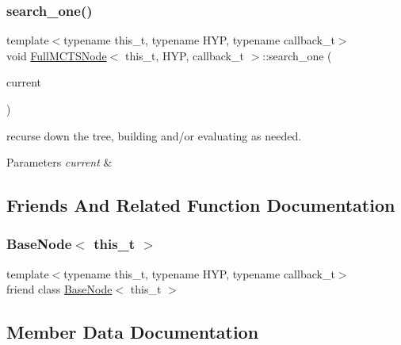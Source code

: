 \subsubsection{\texorpdfstring{search\+\_\+one()}{search\_one()}}
{\footnotesize\ttfamily template$<$typename this\+\_\+t, typename H\+YP, typename callback\+\_\+t$>$ \\
void \hyperlink{class_full_m_c_t_s_node}{Full\+M\+C\+T\+S\+Node}$<$ this\+\_\+t, H\+YP, callback\+\_\+t $>$\+::search\+\_\+one (\begin{DoxyParamCaption}\item[{H\+YP \&}]{current }\end{DoxyParamCaption})\hspace{0.3cm}{\ttfamily [inline]}}



recurse down the tree, building and/or evaluating as needed. 


\begin{DoxyParams}{Parameters}
{\em current} & \\
\hline
\end{DoxyParams}


\subsection{Friends And Related Function Documentation}
\mbox{\label{class_full_m_c_t_s_node_adf841553d0233d2421a8187d9226b7be}} 
\subsubsection{\texorpdfstring{Base\+Node$<$ this\+\_\+t $>$}{BaseNode< this\_t >}}
{\footnotesize\ttfamily template$<$typename this\+\_\+t, typename H\+YP, typename callback\+\_\+t$>$ \\
friend class \hyperlink{class_base_node}{Base\+Node}$<$ this\+\_\+t $>$\hspace{0.3cm}{\ttfamily [friend]}}



\subsection{Member Data Documentation}
\mbox{\label{class_full_m_c_t_s_node_a9bba77400c22c878cb3f015f8ad97613}} 
